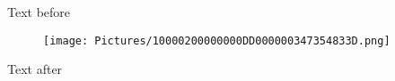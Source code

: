 Text before

\begin{figure}
\centering
\texttt{[image: Pictures/10000200000000DD000000347354833D.png]}
\caption{}
\end{figure}

Text after
